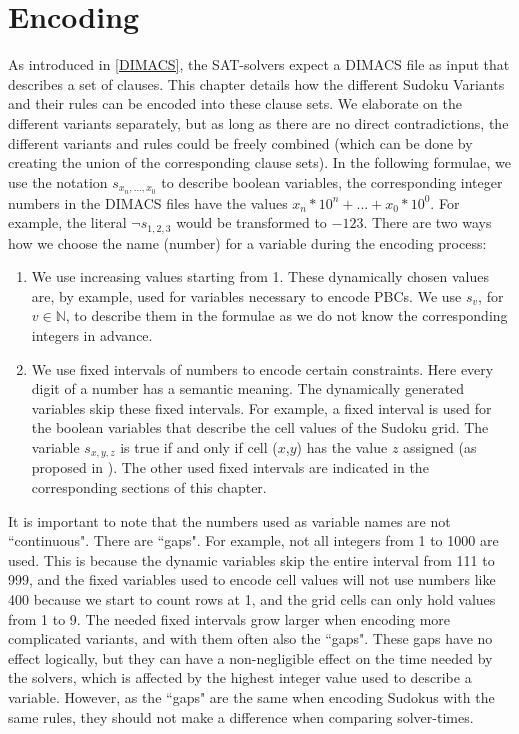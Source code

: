 \chapter{Encoding}\label{Encoding}
As introduced in \ref{DIMACS}, the SAT-solvers expect a DIMACS file as input that describes a set of clauses. This chapter details how the different Sudoku Variants and their rules can be encoded into these clause sets. We elaborate on the different variants separately, but as long as there are no direct contradictions, the different variants and rules could be freely combined (which can be done by creating the union of the corresponding clause sets). In the following formulae, we use the notation $s_{x_{n},...,x_{0}}$ to describe boolean variables, the corresponding integer numbers in the DIMACS files have the values $x_{n}*10^{n}+...+x_{0}*10^{0}$. For example, the literal $\neg s_{1,2,3}$ would be transformed to $-123$. There are two ways how we choose the name (number) for a variable during the encoding process:

\begin{enumerate}
    \item We use increasing values starting from 1. These dynamically chosen values are, by example, used for variables necessary to encode PBCs. We use $s_{v}$, for $v \in \mathbb{N}$, to describe them in the formulae as we do not know the corresponding integers in advance.
    \item  We use fixed intervals of numbers to encode certain constraints. Here every digit of a number has a semantic meaning. The dynamically generated variables skip these fixed intervals. For example, a fixed interval is used for the boolean variables that describe the cell values of the Sudoku grid. The variable $s_{x,y,z}$ is true if and only if cell ($x$,$y$) has the value $z$ assigned (as proposed in \cite{Lynce2006SudokuAsASATProblem}). The other used fixed intervals are indicated in the corresponding sections of this chapter. 
\end{enumerate}

It is important to note that the numbers used as variable names are not ``continuous". There are ``gaps". For example, not all integers from 1 to 1000 are used. This is because the dynamic variables skip the entire interval from 111 to 999, and the fixed variables used to encode cell values will not use numbers like 400 because we start to count rows at 1, and the grid cells can only hold values from 1 to 9. The needed fixed intervals grow larger when encoding more complicated variants, and with them often also the ``gaps". These gaps have no effect logically, but they can have a non-negligible effect on the time needed by the solvers, which is affected by the highest integer value used to describe a variable. However, as the ``gaps" are the same when encoding Sudokus with the same rules, they should not make a difference when comparing solver-times.

